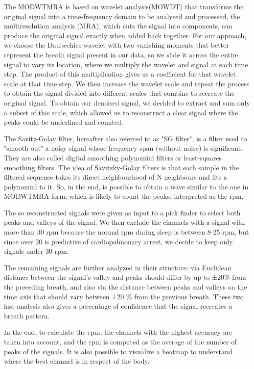 The MODWTMRA is based on wavelet analysis(MOWDT) that transforms the original signal into a time-frequency domain 
to be analysed and processed, the multiresolution analysis (MRA), which cuts the signal into components, can produce the original signal exactly when added back together.
For our approach, we choose the Daubechies wavelet with two vanishing moments that better represent the breath signal present in our data, so we slide it across the entire signal to vary its location, where we multiply the wavelet and signal at each time step. 
The product of this multiplication gives us a coefficient for that wavelet scale at that time step. 
We then increase the wavelet scale and repeat the process to obtain the signal divided into different scales that combine to recreate the original signal. 
To obtain our denoised signal, we decided to extract and sum only a subset of this scale, which allowed us to reconstruct a clear signal where the peaks could be underlined and counted.

The Savitz-Golay filter, hereafter also referred to as "SG filter", is a filter used to "smooth out" a noisy signal whose frequency span (without noise) is significant. 
They are also called digital smoothing polynomial filters or least-squares smoothing filters. 
The idea of Savitzky-Golay filters is that each sample in the filtered sequence takes its direct neighbourhood of N neighbours and fits a polynomial to it.
So, in the end, is possible to obtain a wave similar to the one in MODWTMRA form, which is likely to count the peaks, interpreted as the rpm.

The so reconstructed signals were given as input to a pick finder to select both peaks and valleys of the signal. 
We then exclude the channels with a signal with more than 30 rpm because the normal rpm during sleep is between 8-25 rpm, but since over 20 is predictive of cardiopulmonary arrest, we decide to keep only signals under 30 rpm.

The remaining signals are further analyzed in their structure: via Euclidean distance between the signal's valley and peaks should differ by up to ±20$\%$ from the preceding breath, and also via the distance between peaks and valleys on the time axis that should vary between ±20 \% from the previous breath.
These two last analysis also gives a percentage of confidence that the signal recreates a breath pattern.

In the end, to calculate the rpm, the channels with the highest accuracy are taken into account, and the rpm is computed as the average of the number of peaks of the signals.
It is also possible to visualize a heatmap to understand where the best channel is in respect of the body. 


